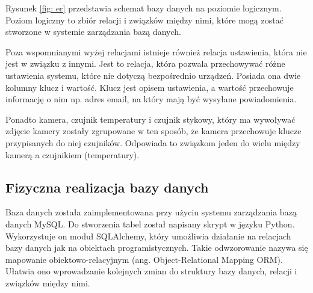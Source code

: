 \documentclass[a4paper,12pt,twoside]{article}
\begin{document}
Rysunek \ref{fig: er} przedstawia schemat bazy danych na poziomie logicznym. Poziom logiczny to zbiór relacji i związków między nimi, które mogą zostać stworzone w systemie zarządzania bazą danych. 

Poza wspomnianymi wyżej relacjami istnieje również relacja ustawienia, która nie jest w związku z innymi. Jest to relacja, która pozwala przechowywać różne ustawienia systemu, które nie dotyczą bezpośrednio urządzeń. Posiada ona dwie kolumny klucz i wartość. Klucz jest opisem ustawienia, a wartość przechowuje informację o nim np. adres email, na który mają być wysyłane powiadomienia. 

Ponadto kamera, czujnik temperatury i czujnik stykowy, który ma wywoływać zdjęcie kamery zostały zgrupowane w ten sposób, że kamera przechowuje klucze przypisanych do niej czujników. Odpowiada to związkom jeden do wielu między kamerą a czujnikiem (temperatury).

\subsection{Fizyczna realizacja bazy danych}
Baza danych została zaimplementowana przy użyciu systemu zarządzania bazą danych MySQL. Do stworzenia tabel został napisany skrypt w języku Python. Wykorzystuje on moduł SQLAlchemy, który umożliwia działanie na relacjach bazy danych jak na obiektach programistycznych. Takie odwzorowanie nazywa się mapowanie obiektowo-relacyjnym (ang. Object-Relational Mapping ORM). Ułatwia ono wprowadzanie kolejnych zmian do struktury bazy danych, relacji i związków między nimi.
\end{document}
